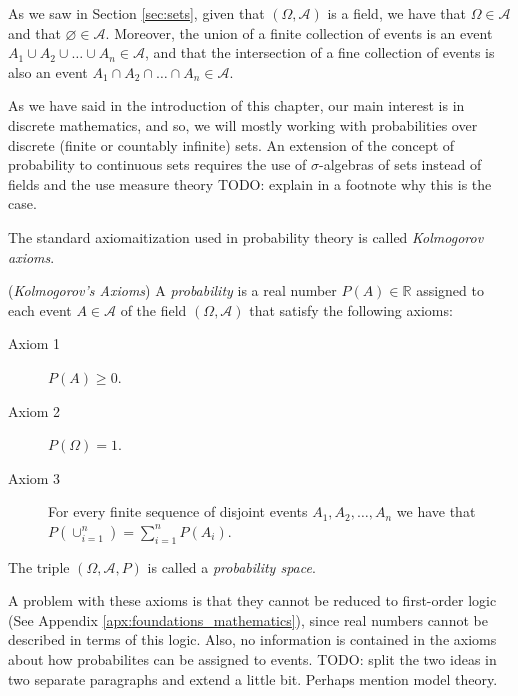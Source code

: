 As we saw in Section \ref{sec:sets}, given that $\left( \Omega, \mathcal{A} \right)$ is a field, we have that $\Omega \in \mathcal{A}$ and that $\varnothing \in \mathcal{A}$. Moreover, the union of a finite collection of events is an event $A_1 \cup A_2 \cup \ldots \cup A_n \in \mathcal{A}$, and that the intersection of a fine collection of events is also an event $A_1 \cap A_2 \cap \ldots \cap A_n \in \mathcal{A}$.

As we have said in the introduction of this chapter, our main interest is in discrete mathematics, and so, we will mostly working with probabilities over discrete (finite or countably infinite) sets. An extension of the concept of probability to continuous sets requires the use of $\sigma$-algebras of sets instead of fields and the use measure theory {\color{red} TODO: explain in a footnote why this is the case}.

The standard axiomaitization used in probability theory is called \emph{Kolmogorov axioms}.

\begin{definition} (\emph{Kolmogorov's Axioms})\label{Kolmogorov_axioms}
A \emph{probability} is a real number $P(A) \in \mathbb{R}$ assigned to each event $A \in \mathcal{A}$ of the field $\left( \Omega, \mathcal{A} \right)$ that satisfy the following axioms:

\medskip

\begin{description}
\item [Axiom 1] $P(A) \geq 0$.
\item [Axiom 2] $P(\Omega) = 1$.
\item [Axiom 3] For every finite sequence of disjoint events $A_1, A_2, \ldots, A_n$ we have that $P(\cup_{i=1}^n) = \sum_{i=1}^n P(A_i)$.
\end{description}

The triple $\left( \Omega, \mathcal{A}, P \right)$ is called a \emph{probability space}. 
\end{definition}

A problem with these axioms is that they cannot be reduced to first-order logic (See Appendix \ref{apx:foundations_mathematics}), since real numbers cannot be described in terms of this logic. Also, no information is contained in the axioms about how probabilites can be assigned to events. {\color{red} TODO: split the two ideas in two separate paragraphs and extend a little bit. Perhaps mention model theory.}

